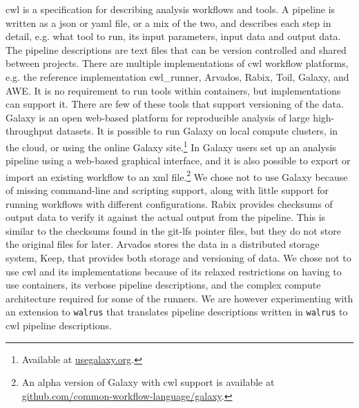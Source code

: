 \gls{cwl} is a specification for describing analysis workflows and
tools.\cite{commonwl} A pipeline is written as a \gls{json} or \gls{yaml} file,
or a mix of the two, and describes each step in detail, e.g. what tool to run,
its input parameters, input data and output data. The pipeline descriptions
are text files that can be version controlled and shared between projects. There
are multiple implementations of \gls{cwl} workflow platforms, e.g. the reference
implementation cwl\_runner,\cite{cwl} Arvados,\cite{arvados} Rabix,\cite{rabix}
Toil,\cite{toil} Galaxy,\cite{goecks2010galaxy} and AWE.\cite{awe} It is no
requirement to run tools within containers, but implementations can support it.
There are few of these tools that support versioning of the data.  Galaxy is an
open web-based platform for reproducible analysis of large high-throughput
datasets.\cite{goecks2010galaxy} It is possible to run Galaxy on local compute
clusters, in the cloud, or using the online Galaxy site.\footnote{Available at
\url{usegalaxy.org}.} In Galaxy users set up an analysis pipeline using a
web-based graphical interface, and it is also possible to export or import an
existing workflow to an \gls{xml} file.\footnote{An alpha version of Galaxy with
\gls{cwl} support is available at
\url{github.com/common-workflow-language/galaxy}.}  We chose not to use Galaxy
because of missing command-line and scripting support, along with little support
for running workflows with different configurations.\cite{spjuth2015experiences}
Rabix provides checksums of output data to verify it against the actual output
from the pipeline. This is similar to the checksums found in the git-lfs pointer
files, but they do not store the original files for later. Arvados stores the
data in a distributed storage system, Keep, that provides both storage and
versioning of data. We chose not to use \gls{cwl} and its implementations
because of its relaxed restrictions on having to use containers, its verbose
pipeline descriptions, and the complex compute architecture required for some of
the runners. We are however experimenting with an extension to \texttt{walrus}
that translates pipeline descriptions written in \texttt{walrus} to \gls{cwl}
pipeline descriptions. 

